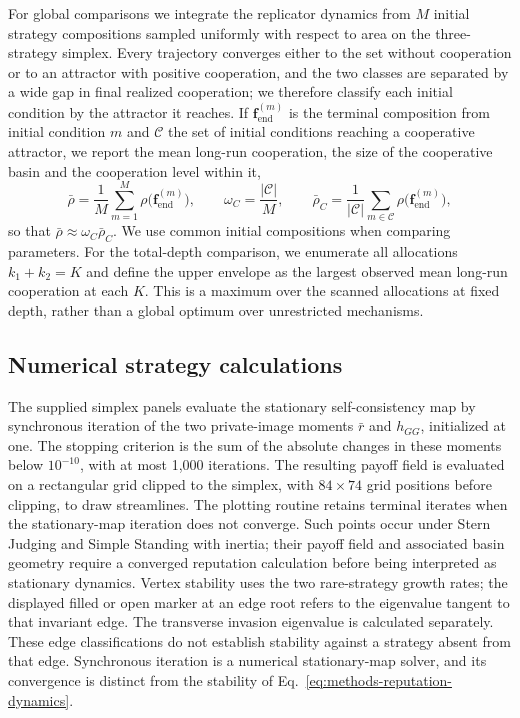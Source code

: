 \documentclass[fleqn,10pt]{article}
\begin{document}
For global comparisons we integrate the replicator dynamics from $M$ initial strategy compositions sampled uniformly with respect to area on the three-strategy simplex. Every trajectory converges either to the set without cooperation or to an attractor with positive cooperation, and the two classes are separated by a wide gap in final realized cooperation; we therefore classify each initial condition by the attractor it reaches. If $\boldsymbol f_{\mathrm{end}}^{(m)}$ is the terminal composition from initial condition $m$ and $\mathcal C$ the set of initial conditions reaching a cooperative attractor, we report the mean long-run cooperation, the size of the cooperative basin and the cooperation level within it,
\begin{equation}
\bar\rho=\frac{1}{M}\sum_{m=1}^{M}\rho\bigl(\boldsymbol f_{\mathrm{end}}^{(m)}\bigr),\qquad
\omega_C=\frac{|\mathcal C|}{M},\qquad
\bar\rho_C=\frac{1}{|\mathcal C|}\sum_{m\in\mathcal C}\rho\bigl(\boldsymbol f_{\mathrm{end}}^{(m)}\bigr),
\label{eq:methods-basin-average}
\end{equation}
so that $\bar\rho\approx\omega_C\bar\rho_C$. We use common initial compositions when comparing parameters. For the total-depth comparison, we enumerate all allocations $k_1+k_2=K$ and define the upper envelope as the largest observed mean long-run cooperation at each $K$. This is a maximum over the scanned allocations at fixed depth, rather than a global optimum over unrestricted mechanisms.

\subsection*{Numerical strategy calculations}

The supplied simplex panels evaluate the stationary self-consistency map by synchronous iteration of the two private-image moments $\bar r$ and $h_{GG}$, initialized at one. The stopping criterion is the sum of the absolute changes in these moments below $10^{-10}$, with at most 1,000 iterations. The resulting payoff field is evaluated on a rectangular grid clipped to the simplex, with $84\times74$ grid positions before clipping, to draw streamlines. The plotting routine retains terminal iterates when the stationary-map iteration does not converge. Such points occur under Stern Judging and Simple Standing with inertia; their payoff field and associated basin geometry require a converged reputation calculation before being interpreted as stationary dynamics. Vertex stability uses the two rare-strategy growth rates; the displayed filled or open marker at an edge root refers to the eigenvalue tangent to that invariant edge. The transverse invasion eigenvalue is calculated separately. These edge classifications do not establish stability against a strategy absent from that edge. Synchronous iteration is a numerical stationary-map solver, and its convergence is distinct from the stability of Eq.~\eqref{eq:methods-reputation-dynamics}.
\end{document}
